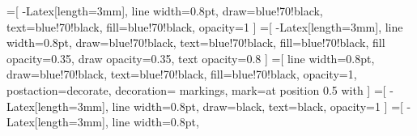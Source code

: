         \newcommand{\drawvector}[5][vector]{%
            \draw[#1] (#2) -- ($(#2)!#4 cm!(#3)$) node[midway, above] {#5};
        }
        \newcommand{\gecentreerdepijl}[1][3mm]{%
            \pgfmathsetlengthmacro{\halflen}{0.5*#1}
            \arrow[xshift=\halflen]{Latex[length=#1]}
        }
        \newcommand{\addvectors}[5][resulterendekracht]{%
           \coordinate (resultante-tmp) at ($(#3)+(#4)-(#2)$);
            \draw[gray, dashed, thin] (#3) -- (resultante-tmp);
            \draw[gray, dashed, thin] (#4) -- (resultante-tmp);
            \draw[#1] (#2) -- (resultante-tmp) node[above] {#5};
        }     
                =[
                    -{Latex[length=3mm]},
                    line width=0.8pt,
                    draw=blue!70!black,
                    text=blue!70!black,
                    fill=blue!70!black,
                    opacity=1
                ]
                =[
                    -{Latex[length=3mm]},
                    line width=0.8pt,
                    draw=blue!70!black,
                    text=blue!70!black,
                    fill=blue!70!black,
                    fill opacity=0.35,
                    draw opacity=0.35,
                    text opacity=0.8
                ]
                =[
                   line width=0.8pt,
                    draw=blue!70!black,
                    text=blue!70!black,
                    fill=blue!70!black,
                    opacity=1,
                    postaction={decorate},
                    decoration={
                        markings,
                        mark=at position 0.5 with {\gecentreerdepijl[3mm]}
                    }
                ]
                =[
                    -{Latex[length=3mm]},
                    line width=0.8pt,
                    draw=black,
                    text=black,
                    opacity=1
                ]
                =[
                    -{Latex[length=3mm]},
                    line width=0.8pt,
